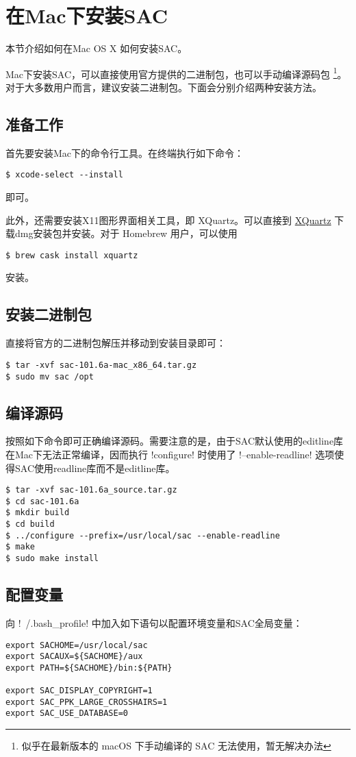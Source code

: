 \section{在Mac下安装SAC}
\label{sec:sac-install-for-mac}
本节介绍如何在Mac OS X 如何安装SAC。

Mac下安装SAC，可以直接使用官方提供的二进制包，也可以手动编译源码包
\footnote{似乎在最新版本的 macOS 下手动编译的 SAC 无法使用，暂无解决办法}。
对于大多数用户而言，建议安装二进制包。下面会分别介绍两种安装方法。

\subsection{准备工作}
首先要安装Mac下的命令行工具。在终端执行如下命令：
\begin{verbatim}
$ xcode-select --install
\end{verbatim}
即可。

此外，还需要安装X11图形界面相关工具，即 XQuartz。可以直接到 \href{http://xquartz.macosforge.org/landing/}{XQuartz}
下载dmg安装包并安装。对于 Homebrew 用户，可以使用
\begin{verbatim}
$ brew cask install xquartz
\end{verbatim}
安装。

\subsection{安装二进制包}
直接将官方的二进制包解压并移动到安装目录即可：
\begin{verbatim}
$ tar -xvf sac-101.6a-mac_x86_64.tar.gz
$ sudo mv sac /opt
\end{verbatim}

\subsection{编译源码}
按照如下命令即可正确编译源码。需要注意的是，由于SAC默认使用的editline库
在Mac下无法正常编译，因而执行 !configure! 时使用了
!--enable-readline! 选项使得SAC使用readline库而不是editline库。
\begin{verbatim}
$ tar -xvf sac-101.6a_source.tar.gz
$ cd sac-101.6a
$ mkdir build
$ cd build
$ ../configure --prefix=/usr/local/sac --enable-readline
$ make
$ sudo make install
\end{verbatim}

\subsection{配置变量}
向 !~/.bash_profile! 中加入如下语句以配置环境变量和SAC全局变量：
\begin{verbatim}
export SACHOME=/usr/local/sac
export SACAUX=${SACHOME}/aux
export PATH=${SACHOME}/bin:${PATH}

export SAC_DISPLAY_COPYRIGHT=1
export SAC_PPK_LARGE_CROSSHAIRS=1
export SAC_USE_DATABASE=0
\end{verbatim}

